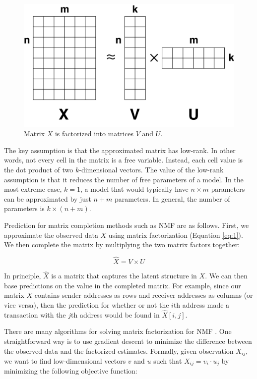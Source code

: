\documentclass{article} %
\begin{document}
\begin{figure}[!htbp]
    \centering
    \includegraphics[scale=0.2]{figures/matrix_completion}
    \caption{\small Matrix $X$ is factorized into matrices $V$ and $U$.}
    \label{fig:matrix_completion}
\end{figure}

The key assumption is that the approximated matrix has low-rank. In other words, not every cell in the matrix is a free variable. Instead, each cell value is the dot product of two $k$-dimensional vectors. The value of the low-rank assumption is that it reduces the number of free parameters of a model. In the most extreme case, $k=1$, a model that would typically have $n \times m$ parameters can be approximated by just $n + m$ parameters. In general, the number of parameters is $k \times (n + m)$.

Prediction for matrix completion methods such as NMF are as follows. First, we approximate the observed data $X$ using matrix factorization (Equation \ref{eq:1}). We then complete the matrix by multiplying the two matrix factors together:

$$
\hat{X} = V \times U
$$

In principle, $\hat{X}$ is a matrix that captures the latent structure in $X$. We can then base predictions on the value in the completed matrix. For example, since our matrix $X$ contains sender addresses as rows and receiver addresses as columns (or vice versa), then the prediction for whether or not the $i$th address made a transaction with the $j$th address would be found in $\hat{X}[i, j]$.

There are many algorithms for solving matrix factorization for NMF \cite{lee2001algorithms}. One straightforward way is to use gradient descent to minimize the difference between the observed data and the factorized estimates. Formally, given observation $X_{ij}$, we want to find low-dimensional vectors $v$ and $u$ such that $X_{ij} = v_i \cdot  u_j$ by minimizing the following objective function:
\end{document}
